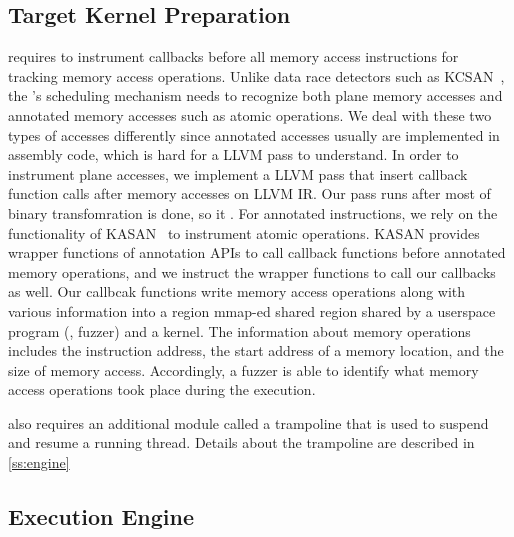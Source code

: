 \subsection{Target Kernel Preparation}
\label{ss:instrumentation}

\sys requires to instrument callbacks before all memory access
instructions for tracking memory access operations.
%
Unlike data race detectors such as KCSAN~\cite{kcsan}, the \sys's
scheduling mechanism needs to recognize both plane memory accesses and
annotated memory accesses such as atomic operations.
%
We deal with these two types of accesses differently since annotated
accesses usually are implemented in assembly code, which is hard for a
LLVM pass to understand.
%
In order to instrument plane accesses, we implement a LLVM pass that
insert callback function calls after memory accesses on LLVM IR.
%
Our pass runs after most of binary transfomration is done, so it
.
%
For annotated instructions, we rely on the functionality of
KASAN~\cite{kasan} to instrument atomic operations.
%
KASAN provides wrapper functions of annotation APIs to call callback
functions before annotated memory operations, and we instruct the
wrapper functions to call our callbacks as well.
%
Our callbcak functions write memory access operations along with
various information into a region mmap-ed shared region shared by a
userspace program (\ie, fuzzer) and a kernel. The information about
memory operations includes the instruction address, the start address
of a memory location, and the size of memory access.
%
Accordingly, a fuzzer is able to identify what memory access
operations took place during the execution.

\sys also requires an additional module called a trampoline that is
used to suspend and resume a running thread. Details about the
trampoline are described in \autoref{ss:engine}



\subsection{Execution Engine}
\label{ss:engine}

